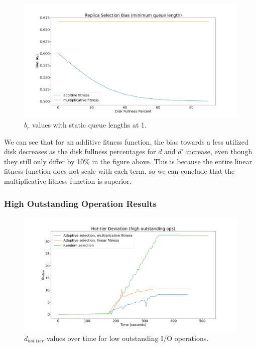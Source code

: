 \documentclass[12pt]{article}
\begin{document}
    \begin{figure}[htbp]
      \centering
      \includegraphics[scale=0.32]{images/replica_selection_bias_min_qlen.png} 
      \caption{$b_r$ values with static queue lengths at 1.}
      \label{fig:bias_min_qlen}
    \end{figure}

    We can see that for an additive fitness function, the bias towards a less
    utilized disk decreases as the disk fullness percentages for $d$ and $d'$
    increase, even though they still only differ by 10\% in the figure above.
    This is because the entire linear fitness function does not scale with each
    term, so we can conclude that the multiplicative fitness function is
    superior.

    \subsubsection{High Outstanding Operation Results}

    \begin{figure}[htbp]
      \centering
      \includegraphics[scale=0.32]{images/high_outstanding_exp.png} 
      \caption{$d_{hot\ tier}$ values over time for low outstanding I/O
               operations.}
      \label{fig:high_outstanding_tier_disparity}
    \end{figure}
\end{document}
